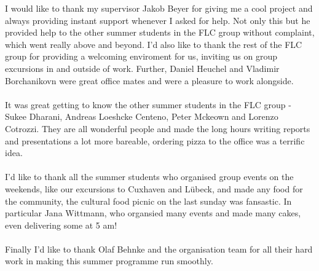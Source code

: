 I would like to thank my supervisor Jakob Beyer for giving me a cool project and always providing instant support whenever I asked for help. Not only this but he provided help to the other summer students in the FLC group without complaint, which went really above and beyond. I'd also like to thank the rest of the FLC group for providing a welcoming enviroment for us, inviting us on group excursions in and outside of work. Further, Daniel Heuchel and Vladimir Borchanikovn were great office mates and were a pleasure to work alongside.
\\\\
It was great getting to know the other summer students in the FLC group - Sukee Dharani, Andreas Loeshcke Centeno, Peter Mckeown and Lorenzo Cotrozzi. They are all wonderful people and made the long hours writing reports and presentations a lot more bareable, ordering pizza to the office was a terrific idea.
\\\\
I'd like to thank all the summer students who organised group events on the weekends, like our excursions to Cuxhaven and L\"ubeck, and made any food for the community, the cultural food picnic on the last sunday was fansastic. In particular Jana Wittmann, who organsied many events and made many cakes, even delivering some at 5 am!
\\\\
Finally I'd like to thank Olaf Behnke and the organisation team for all their hard work in making this summer programme run smoothly.
